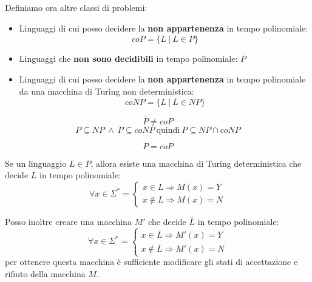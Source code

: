 Definiamo ora altre classi di problemi:
\begin{itemize}
    \item Linguaggi di cui posso decidere la \textbf{non appartenenza} in tempo polinomiale:
    \begin{equation}
        coP = \{L \ | \ \overline{L} \in P\}
    \end{equation}
    \item Linguaggi che \textbf{non sono decidibili} in tempo polinomiale: $\overline{P}$
    \item Linguaggi di cui posso decidere la \textbf{non appartenenza} in tempo 
    polinomiale da una macchina di Turing non deterministica:
    \begin{equation}
        coNP = \{L \ | \ \overline{L} \in NP\}
    \end{equation}
\end{itemize}
\begin{nota}
    \begin{equation}
        \overline{P} \neq coP
    \end{equation}
    \begin{equation}
        P \subseteq NP \ \land \ P \subseteq coNP \ \text{quindi} \ P \subseteq NP \cap coNP
    \end{equation}
\end{nota}
\begin{teorema}
\begin{equation}
    P = coP
\end{equation}
\end{teorema}
\begin{dimostrazione}
    Se un linguaggio $L \in P$, allora esiste una macchina di Turing deterministica
     che decide $L$ in tempo polinomiale:
    \begin{equation}
        \forall x \in \Sigma^{\ast} = \begin{cases}
            x \in L \Rightarrow M(x) = Y \\
            x \not\in L \Rightarrow M(x) = N
        \end{cases}
    \end{equation}

    Posso inoltre creare una macchina $M'$ che decide $\overline{L}$ in tempo polinomiale: 
    \begin{equation}
        \forall x \in \Sigma^{\ast} = \begin{cases}
            x \in \overline{L} \Rightarrow M'(x) = Y \\
            x \not\in \overline{L} \Rightarrow M'(x) = N
        \end{cases}   
    \end{equation}
    per ottenere questa macchina è sufficiente modificare gli stati di accettazione 
    e rifiuto della macchina $M$.
\end{dimostrazione}

